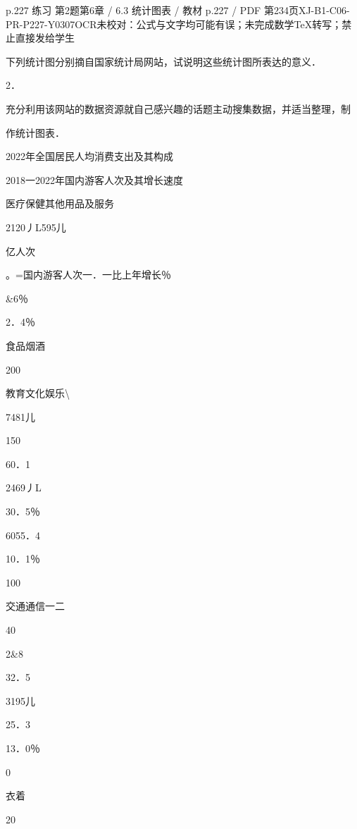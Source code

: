 \begin{bankitem}{p.227 练习 第2题}{第6章 / 6.3 统计图表 / 教材 p.227 / PDF 第234页}{XJ-B1-C06-PR-P227-Y0307}{OCR未校对：公式与文字均可能有误；未完成数学TeX转写；禁止直接发给学生}
\begin{ocrdraft}
\par
下列统计图分别摘自国家统计局网站，试说明这些统计图所表达的意义．
\par
2．
\par
充分利用该网站的数据资源就自己感兴趣的话题主动搜集数据，并适当整理，制
\par
作统计图表．
\par
2022年全国居民人均消费支出及其构成
\par
2018一2022年国内游客人次及其增长速度
\par
医疗保健其他用品及服务
\par
2120丿L595儿
\par
亿人次
\par
。=国内游客人次一．一比上年增长％
\par
\&6％
\par
2．4％
\par
食品烟酒
\par
200
\par
教育文化娱乐\textbackslash{}
\par
7481儿
\par
150
\par
60．1
\par
2469丿L
\par
30．5％
\par
6055．4
\par
10．1％
\par
100
\par
交通通信一二
\par
40
\par
2\&8
\par
32．5
\par
3195儿
\par
25．3
\par
13．0％
\par
0
\par
衣着
\par
20
\par

\end{ocrdraft}
\end{bankitem}
